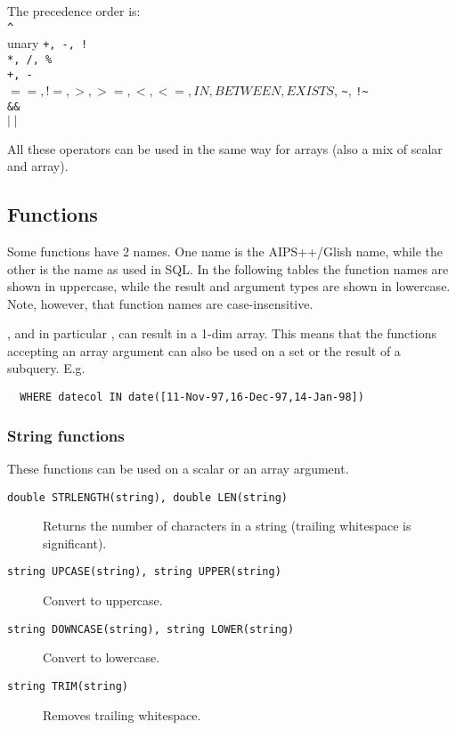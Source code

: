 \begin{description}
  \item The precedence order is:
       \\\verb+^+
       \\unary \texttt{+, -, !}
       \\\texttt{*, /, \%}
       \\\texttt{+, -}
       \\\texttt{$==, !=, >, >=, <, <=, IN, BETWEEN, EXISTS$},
              \verb+~+, \verb+!~+
       \\\texttt{\&\&}
       \\\texttt{$\mid\mid$}
\end{description}
All these operators can be used in the same way for arrays
(also a mix of scalar and array).

\subsection{\label{TAQL:FUNCTIONS}Functions}
Some functions have 2 names. One name is the AIPS++/Glish name, while the
other is the name as used in SQL.
In the following tables the function names are shown in uppercase,
while the result and argument types are shown in lowercase.
Note, however, that function names are case-insensitive.

, and in particular
, can result in a 1-dim array.
This means that the functions accepting an array argument can also
be used on a set or the result of a subquery. E.g.
\begin{verbatim}
  WHERE datecol IN date([11-Nov-97,16-Dec-97,14-Jan-98])
\end{verbatim}
\subsubsection{String functions}
These functions can be used on a scalar or an array argument.
\begin{description}
  \item[ \texttt{double STRLENGTH(string),  double LEN(string)}]
       Returns the number of characters in a string
       (trailing whitespace is significant).
  \item[ \texttt{string UPCASE(string), string UPPER(string) }]
        Convert to uppercase.
  \item[ \texttt{string DOWNCASE(string),  string LOWER(string)}]
        Convert to lowercase.
  \item[ \texttt{string TRIM(string)}]
       Removes trailing whitespace.
\end{description}

